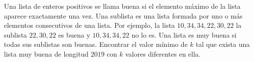 Una lista de enteros positivos se llama buena si el elemento máximo de la lista aparece exactamente una vez. Una sublista es una lista formada por uno o más elementos consecutivos de una lista. Por ejemplo, la lista $10,34,34,22,30,22$ la sublista $22,30,22$ es buena y $10,34,34,22$ no lo es. Una lista es muy buena si todas sus sublistas son buenas. Encontrar el valor mínimo de $k$ tal que exista una lista muy buena de longitud $2019$ con $k$ valores diferentes en ella.
